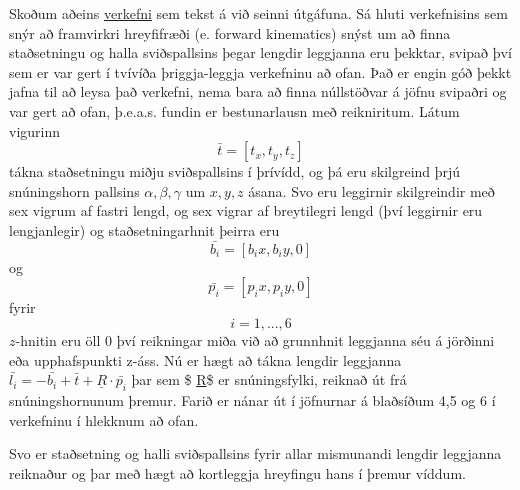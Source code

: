 \documentclass[11pt]{article}
\begin{document}
Skoðum aðeins
\href{https://www.researchgate.net/publication/2564027_Forward_Kinematics_of_a_Stewart_Platform_Mechanism}{verkefni}
sem tekst á við seinni útgáfuna. Sá hluti verkefnisins sem snýr að
framvirkri hreyfifræði (e. forward kinematics) snýst um að finna
staðsetningu og halla sviðspallsins þegar lengdir leggjanna eru þekktar,
svipað því sem er var gert í tvívíða þriggja-leggja verkefninu að ofan.
Það er engin góð þekkt jafna til að leysa það verkefni, nema bara að
finna núllstöðvar á jöfnu svipaðri og var gert að ofan, þ.e.a.s. fundin
er bestunarlausn með reikniritum. Látum vigurinn
\[\bar{t} = [t_x, t_y, t_z]\] tákna staðsetningu miðju sviðspallsins í
þrívídd, og þá eru skilgreind þrjú snúningshorn pallsins
\(\alpha, \beta, \gamma\) um \(x, y, z\) ásana. Svo eru leggirnir
skilgreindir með sex vigrum af fastri lengd, og sex vigrar af
breytilegri lengd (því leggirnir eru lengjanlegir) og staðsetningarhnit
þeirra eru \[\bar{b_i} = [b_ix, b_iy, 0]\] og
\[\bar{p_i} = [p_ix, p_iy, 0]\] fyrir \[i = 1,...,6\] \(z\)-hnitin eru
öll \(0\) því reikningar miða við að grunnhnit leggjanna séu á jörðinni
eða upphafspunkti z-áss. Nú er hægt að tákna lengdir leggjanna
\(\bar{l_i} = -\bar{b_i} + \bar{t} + \underline{R}\cdot\bar{p_i}\) þar
sem \$ \underline{R}\$ er snúningsfylki, reiknað út frá snúningshornunum
þremur. Farið er nánar út í jöfnurnar á blaðsíðum 4,5 og 6 í verkefninu
í hlekknum að ofan.

Svo er staðsetning og halli sviðspallsins fyrir allar mismunandi lengdir
leggjanna reiknaður og þar með hægt að kortleggja hreyfingu hans í
þremur víddum.


    
    
    
    
\end{document}

